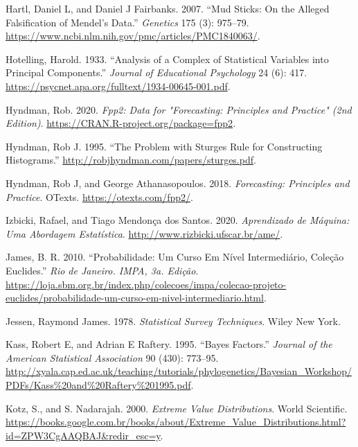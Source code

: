 \documentclass[
]{book}
\newlength{\cslhangindent}
\newenvironment{cslreferences}%
  {\setlength{\parindent}{0pt}%
  \everypar{\setlength{\hangindent}{\cslhangindent}}\ignorespaces}%
  {\par}
\theoremstyle{definition}
\theoremstyle{definition}
\theoremstyle{definition}
\theoremstyle{remark}
\begin{document}
\begin{cslreferences}
\leavevmode\hypertarget{ref-hartl2007mud}{}%
Hartl, Daniel L, and Daniel J Fairbanks. 2007. ``Mud Sticks: On the Alleged Falsification of Mendel's Data.'' \emph{Genetics} 175 (3): 975--79. \url{https://www.ncbi.nlm.nih.gov/pmc/articles/PMC1840063/}.

\leavevmode\hypertarget{ref-hotelling1933analysis}{}%
Hotelling, Harold. 1933. ``Analysis of a Complex of Statistical Variables into Principal Components.'' \emph{Journal of Educational Psychology} 24 (6): 417. \url{https://psycnet.apa.org/fulltext/1934-00645-001.pdf}.

\leavevmode\hypertarget{ref-hyndman2020fpp2}{}%
Hyndman, Rob. 2020. \emph{Fpp2: Data for "Forecasting: Principles and Practice" (2nd Edition)}. \url{https://CRAN.R-project.org/package=fpp2}.

\leavevmode\hypertarget{ref-hyndman1995problem}{}%
Hyndman, Rob J. 1995. ``The Problem with Sturges Rule for Constructing Histograms.'' \url{http://robjhyndman.com/papers/sturges.pdf}.

\leavevmode\hypertarget{ref-hyndman2018forecasting}{}%
Hyndman, Rob J, and George Athanasopoulos. 2018. \emph{Forecasting: Principles and Practice}. OTexts. \url{https://otexts.com/fpp2/}.

\leavevmode\hypertarget{ref-izbicki2020aprendizado}{}%
Izbicki, Rafael, and Tiago Mendonça dos Santos. 2020. \emph{Aprendizado de Máquina: Uma Abordagem Estatística}. \url{http://www.rizbicki.ufscar.br/ame/}.

\leavevmode\hypertarget{ref-james2010probabilidade}{}%
James, B. R. 2010. ``Probabilidade: Um Curso Em Nível Intermediário, Coleção Euclides.'' \emph{Rio de Janeiro. IMPA, 3a. Edição}. \url{https://loja.sbm.org.br/index.php/colecoes/impa/colecao-projeto-euclides/probabilidade-um-curso-em-nivel-intermediario.html}.

\leavevmode\hypertarget{ref-jessen1978statistical}{}%
Jessen, Raymond James. 1978. \emph{Statistical Survey Techniques}. Wiley New York.

\leavevmode\hypertarget{ref-kass1995bayes}{}%
Kass, Robert E, and Adrian E Raftery. 1995. ``Bayes Factors.'' \emph{Journal of the American Statistical Association} 90 (430): 773--95. \url{http://xyala.cap.ed.ac.uk/teaching/tutorials/phylogenetics/Bayesian_Workshop/PDFs/Kass\%20and\%20Raftery\%201995.pdf}.

\leavevmode\hypertarget{ref-kotz2000extreme}{}%
Kotz, S., and S. Nadarajah. 2000. \emph{Extreme Value Distributions}. World Scientific. \url{https://books.google.com.br/books/about/Extreme_Value_Distributions.html?id=ZPW3CgAAQBAJ\&redir_esc=y}.


\end{cslreferences}
\end{document}
